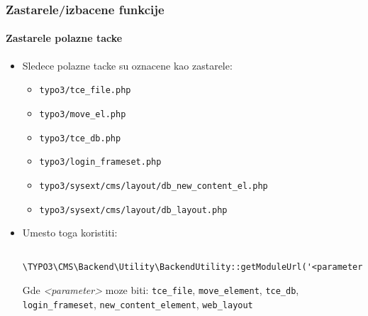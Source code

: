 \begin{frame}[fragile]
	\frametitle{Zastarele/izbacene funkcije}
	\framesubtitle{Zastarele polazne tacke}

	\begin{itemize}
		\item Sledece polazne tacke su oznacene kao zastarele:

			\begin{itemize}
				\item \texttt{typo3/tce\_file.php}
				\item \texttt{typo3/move\_el.php}
				\item \texttt{typo3/tce\_db.php}
				\item \texttt{typo3/login\_frameset.php}
				\item \texttt{typo3/sysext/cms/layout/db\_new\_content\_el.php}
				\item \texttt{typo3/sysext/cms/layout/db\_layout.php}
			\end{itemize}

		\item Umesto toga koristiti:
			\begin{lstlisting}
				\TYPO3\CMS\Backend\Utility\BackendUtility::getModuleUrl('<parameter>')
			\end{lstlisting}

			Gde \textit{<parameter>} moze biti:\newline
				\small
					\texttt{tce\_file}, \texttt{move\_element}, \texttt{tce\_db},
					\texttt{login\_frameset}, \texttt{new\_content\_element}, \texttt{web\_layout}
				\normalsize
	\end{itemize}

\end{frame}


